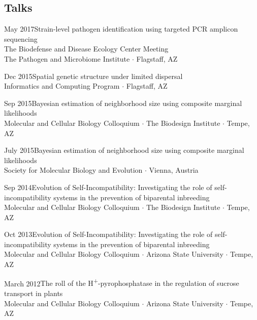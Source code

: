 \documentclass[]{cv-style}          %
\begin{document}
\subsection{Talks}
\begin{entrylist}
\entry
{May 2017}{\normalfont Strain-level pathogen identification using targeted PCR amplicon sequencing}{\\The Biodefense and Disease Ecology Center Meeting\\The Pathogen and Microbiome Institute $\cdotp$ Flagstaff, AZ}
{\vspace{-0.3cm}}
\end{entrylist}
\begin{entrylist}
\entry
{Dec 2015}{\normalfont Spatial genetic structure under limited dispersal}{\\Informatics and Computing Program  $\cdotp$ Flagstaff, AZ}
{\vspace{-0.3cm}}
\end{entrylist}
\begin{entrylist}
\entry
{Sep 2015}{\normalfont Bayesian estimation of neighborhood size using composite marginal likelihoods}{\\Molecular and Cellular Biology Colloquium $\cdot$ The Biodesign Institute $\cdot$ Tempe, AZ}
{\vspace{-0.3cm}}
\end{entrylist}
\begin{entrylist}
\entry
{July 2015}{\normalfont Bayesian estimation of neighborhood size using composite marginal likelihoods}{\\Society for Molecular Biology and Evolution $\cdotp$ Vienna, Austria}
{\vspace{-0.3cm}}
\end{entrylist}
\begin{entrylist}
\entry
{Sep 2014}{\normalfont Evolution of Self-Incompatibility: Investigating the role of self-incompatibility systems in the prevention of biparental inbreeding}{\\Molecular and Cellular Biology Colloquium $\cdot$ The Biodesign Institute $\cdot$ Tempe, AZ}
{\vspace{-0.3cm}}
\end{entrylist}
\begin{entrylist}
\entry
{Oct 2013}{\normalfont Evolution of Self-Incompatibility: Investigating the role of self-incompatibility systems in the prevention of biparental inbreeding}{\\Molecular and Cellular Biology Colloquium $\cdot$ Arizona State University $\cdot$ Tempe, AZ}
{\vspace{-0.3cm}}
\end{entrylist}
\begin{entrylist}
\entry
{March 2012}{\normalfont The roll of the H\textsuperscript{+}-pyrophosphatase in the regulation of sucrose transport in plants}{\\Molecular and Cellular Biology Colloquium $\cdot$ Arizona State University $\cdot$ Tempe, AZ}
{\vspace{-0.3cm}}
\end{entrylist}
\end{document}
